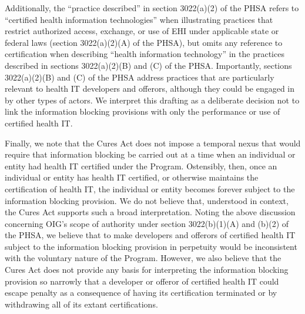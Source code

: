 \documentclass[twoside,11pt]{article}
\begin{document}
          Additionally, the “practice described” in section 3022(a)(2) of the PHSA refers to “certified health information technologies” when illustrating practices that restrict authorized access, exchange, or use of EHI under applicable state or federal laws (section 3022(a)(2)(A) of the PHSA), but omits any reference to certification when describing “health information technology” in the practices described in sections 3022(a)(2)(B) and (C) of the PHSA. Importantly, sections 3022(a)(2)(B) and (C) of the PHSA address practices that are particularly relevant to health IT developers and offerors, although they could be engaged in by other types of actors. We interpret this drafting as a deliberate decision not to link the information blocking provisions with only the performance or use of certified health IT.


          Finally, we note that the Cures Act does not impose a temporal nexus that would require that information blocking be carried out at a time when an individual or entity had health IT certified under the Program. Ostensibly, then, once an individual or entity has health IT certified, or otherwise maintains the certification of health IT, the individual or entity becomes forever subject to the information blocking provision. We do not believe that, understood in context, the Cures Act supports such a broad interpretation. Noting the above discussion concerning OIG's scope of authority under section 3022(b)(1)(A) and (b)(2) of the PHSA, we believe that to make developers and offerors of certified health IT subject to the information blocking provision in perpetuity would be inconsistent with the voluntary nature of the Program. However, we also believe that the Cures Act does not provide any basis for interpreting the information blocking provision so narrowly that a developer or offeror of certified health IT could escape penalty as a consequence of having its certification terminated or by withdrawing all of its extant certifications.
\end{document}
